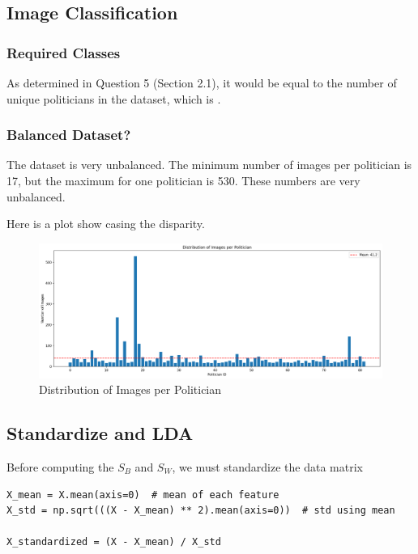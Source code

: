 \documentclass[12pt]{article}
\begin{document}
\subsection{Image Classification}

\subsubsection{Required Classes}

As determined in Question 5 (Section 2.1), it would be equal to the number of unique politicians in the dataset, which is 
.

\subsubsection{Balanced Dataset?}

The dataset is very unbalanced. The minimum number of images per politician is 17, but the maximum for one politician is 530. These numbers are very unbalanced.

Here is a plot show casing the disparity.

\begin{figure}[H]
    \centering
    \includegraphics[width=0.8\linewidth]{images/distribution_of_politicians.png}
    \caption{Distribution of Images per Politician}
    \label{fig:distriplot}
\end{figure}

\subsection{Standardize and LDA}

Before computing the $S_B$ and $S_W$, we must standardize the data matrix 

\begin{lstlisting}
X_mean = X.mean(axis=0)  # mean of each feature
X_std = np.sqrt(((X - X_mean) ** 2).mean(axis=0))  # std using mean

X_standardized = (X - X_mean) / X_std
\end{lstlisting}
\end{document}

